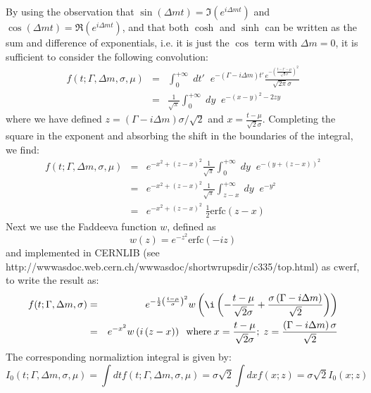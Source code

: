 \documentclass[a4paper,10pt,twosided]{article}
\begin{document}
By using the observation that $\sin(\Delta m t) = \Im\left( e^{i\Delta m t}\right)$ and $\cos(\Delta m t ) = \Re\left( e^{ i \Delta m t } \right)$, and that both $\cosh$ and $\sinh$ can
be written as the sum and difference of exponentials, i.e. it is just the $\cos$ term with $\Delta m = 0$, it is sufficient to consider the following convolution:
\begin{eqnarray*}
f(t;\Gamma,\Delta m,\sigma,\mu) &=& \int_0^{+\infty}\;dt'\;\; e^{-(\Gamma -i \Delta m)t'} \frac{ e^{-\left( \frac{t-t'-\mu}{\sqrt{2}\sigma} \right)^2}}{\sqrt{2\pi}\sigma}
\\                          &=& \frac{1}{\sqrt{\pi}} \int_0^{+\infty}\;dy \;\;  e^{-\left(x-y \right)^2-2zy}
\end{eqnarray*}
where we have defined $z = (\Gamma - i \Delta m ) \sigma/\sqrt{2}$ and $x = \frac{t-\mu}{\sqrt{2}\sigma}$.
Completing the square in the exponent and absorbing the shift in the boundaries of the integral, we find:
\begin{eqnarray*}
f(t;\Gamma,\Delta m,\sigma,\mu) &=& e^{-x^2+(z-x)^2}  \frac{1}{\sqrt{\pi}} \int_0^{+\infty}\;dy \;\; e^{-\left(y+(z-x) \right)^2}
\\                          &=&  e^{-x^2+(z-x)^2}  \frac{1}{\sqrt{\pi}} \int_{z-x}^{+\infty}\;dy \;\; e^{-y^2 }
\\                          &=&  e^{-x^2+(z-x)^2}  \; \frac{1}{2}\mathrm{erfc}\left(z-x \right)
\end{eqnarray*}
Next we use the Faddeeva function $w$,  defined as 
\begin{equation}
    w(z) = e^{-z^2}\mathrm{erfc}\left(-iz\right)
\end{equation}
and implemented in CERNLIB (see http://wwwasdoc.web.cern.ch/wwwasdoc/shortwrupsdir/c335/top.html) as $\mathrm{cwerf}$, to write the result as:
\begin{eqnarray*}
f(t;\Gamma,\Delta m,\sigma) 
     &=& e^{-\frac{1}{2}\left(\frac{t-\mu}{\sigma}\right)^2} w\left( \i \left( -\frac{t-\mu}{\sqrt{2}\sigma} + \frac{\sigma\left(\Gamma-i\Delta m \right)}{\sqrt{2}} \right)  \right)
\\ &=&  e^{-x^2} w\left( i \left( z-x\right)\right)\;\; \mathrm{where} \; x=\frac{t-\mu}{\sqrt{2}\sigma};\; z = \frac{\left(\Gamma-i\Delta m\right)\sigma}{\sqrt{2}}
\end{eqnarray*}
The corresponding normaliztion integral is given by:
\begin{equation*}
    I_0(t;\Gamma,\Delta m,\sigma,\mu)  = \int dt f(t;\Gamma,\Delta m, \sigma,\mu) = \sigma \sqrt{2} \int dx f(x;z) = \sigma \sqrt{2} I_0(x;z)
\end{equation*}
\end{document}
